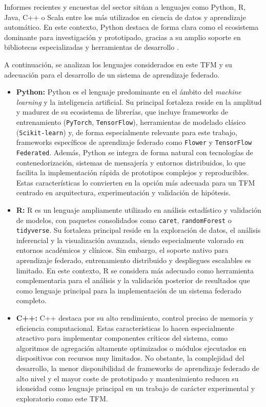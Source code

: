 \documentclass{report}
\begin{document}
Informes recientes y encuestas del sector \cite{datacamp2025,stackoverflow2024,tiobe2025} sitúan a lenguajes como Python, R, Java, C++ o Scala entre los más utilizados en ciencia de datos y aprendizaje automático. En este contexto, Python destaca de forma clara como el ecosistema dominante para investigación y prototipado, gracias a su amplio soporte en bibliotecas especializadas y herramientas de desarrollo \cite{geeksforgeeks2025}.

A continuación, se analizan los lenguajes considerados en este TFM y su adecuación para el desarrollo de un sistema de aprendizaje federado.

\begin{itemize}
    \item \textbf{Python:}  
    Python es el lenguaje predominante en el ámbito del \textit{machine learning} y la inteligencia artificial. Su principal fortaleza reside en la amplitud y madurez de su ecosistema de librerías, que incluye frameworks de entrenamiento (\texttt{PyTorch}, \texttt{TensorFlow}), herramientas de modelado clásico (\texttt{Scikit-learn}) y, de forma especialmente relevante para este trabajo, frameworks específicos de aprendizaje federado como \texttt{Flower} y \texttt{TensorFlow Federated}.  
    Además, Python se integra de forma natural con tecnologías de contenedorización, sistemas de mensajería y entornos distribuidos, lo que facilita la implementación rápida de prototipos complejos y reproducibles. Estas características lo convierten en la opción más adecuada para un TFM centrado en arquitectura, experimentación y validación de hipótesis.

    \item \textbf{R:}  
R es un lenguaje ampliamente utilizado en análisis estadístico y validación de modelos, con paquetes consolidados como \texttt{caret}, \texttt{randomForest} o \texttt{tidyverse}. Su fortaleza principal reside en la exploración de datos, el análisis inferencial y la visualización avanzada, siendo especialmente valorado en entornos académicos y clínicos.  
Sin embargo, el soporte nativo para aprendizaje federado, entrenamiento distribuido y despliegues escalables es limitado. En este contexto, R se considera más adecuado como herramienta complementaria para el análisis y la validación posterior de resultados que como lenguaje principal para la implementación de un sistema federado completo.

\item \textbf{C++:}  
C++ destaca por su alto rendimiento, control preciso de memoria y eficiencia computacional. Estas características lo hacen especialmente atractivo para implementar componentes críticos del sistema, como algoritmos de agregación altamente optimizados o módulos ejecutados en dispositivos con recursos muy limitados.  
No obstante, la complejidad del desarrollo, la menor disponibilidad de frameworks de aprendizaje federado de alto nivel y el mayor coste de prototipado y mantenimiento reducen su idoneidad como lenguaje principal en un trabajo de carácter experimental y exploratorio como este TFM.



\end{itemize}
\end{document}
